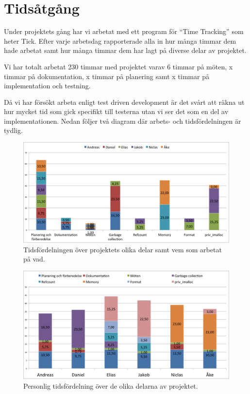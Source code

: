 \documentclass{article}
\begin{document}
\section{Tidsåtgång}

Under projektets gång har vi arbetat med ett program för “Time Tracking” som heter Tick. Efter varje arbetsdag rapporterade alla in hur många timmar dem hade arbetat samt hur många timmar dem har lagt på diverse delar av projektet.

Vi har totalt arbetat 230 timmar med projektet varav 6 timmar på möten, x timmar på dokumentation, x timmar på planering samt x timmar på implementation och testning.

Då vi har försökt arbeta enligt test driven development är det svårt att räkna ut hur mycket tid som gick specifikt till testerna utan vi ser det som en del av implementationen. Nedan följer två diagram där arbets- och tidsfördelningen är tydlig.

\begin{figure}[H]
  \includegraphics[width=\columnwidth]{../bilder/chart_parts.png}
  \caption{Tidsfördelningen över projektets olika delar 
    samt vem som arbetat på vad.}
  \label{fig:chart_parts}
\end{figure}

\begin{figure}[H]
  \includegraphics[width=\columnwidth]{../bilder/chart_people.png}
  \caption{Personlig tidsfördelning över de olika delarna av projektet.}
  \label{fig:chart_people}
\end{figure}
\end{document}
